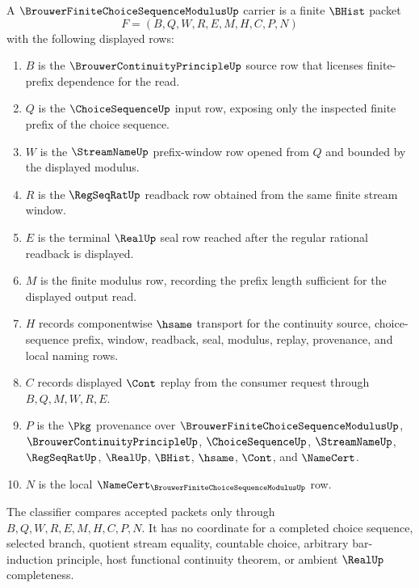 \begin{definition}
\label{def:brouwer-finite-choice-sequence-modulus-carrier}
A $\BrouwerFiniteChoiceSequenceModulusUp$ carrier is a finite $\BHist$ packet
$$
F=(B,Q,W,R,E,M,H,C,P,N)
$$
with the following displayed rows:
\begin{enumerate}
\item $B$ is the $\BrouwerContinuityPrincipleUp$ source row that licenses finite-prefix dependence for the read.
\item $Q$ is the $\ChoiceSequenceUp$ input row, exposing only the inspected finite prefix of the choice sequence.
\item $W$ is the $\StreamNameUp$ prefix-window row opened from $Q$ and bounded by the displayed modulus.
\item $R$ is the $\RegSeqRatUp$ readback row obtained from the same finite stream window.
\item $E$ is the terminal $\RealUp$ seal row reached after the regular rational readback is displayed.
\item $M$ is the finite modulus row, recording the prefix length sufficient for the displayed output read.
\item $H$ records componentwise $\hsame$ transport for the continuity source, choice-sequence prefix, window, readback, seal, modulus, replay, provenance, and local naming rows.
\item $C$ records displayed $\Cont$ replay from the consumer request through $B,Q,M,W,R,E$.
\item $P$ is the $\Pkg$ provenance over $\BrouwerFiniteChoiceSequenceModulusUp$, $\BrouwerContinuityPrincipleUp$, $\ChoiceSequenceUp$, $\StreamNameUp$, $\RegSeqRatUp$, $\RealUp$, $\BHist$, $\hsame$, $\Cont$, and $\NameCert$.
\item $N$ is the local $\NameCert_{\BrouwerFiniteChoiceSequenceModulusUp}$ row.
\end{enumerate}
The classifier compares accepted packets only through $B,Q,W,R,E,M,H,C,P,N$. It has no coordinate for a completed choice sequence, selected branch, quotient stream equality, countable choice, arbitrary bar-induction principle, host functional continuity theorem, or ambient $\RealUp$ completeness.
\end{definition}

